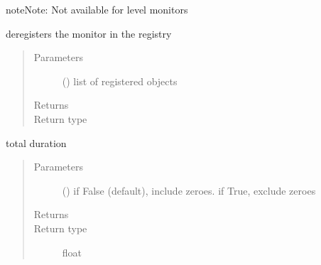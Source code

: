 \documentclass[letterpaper,10pt,english]{sphinxmanual}
\begin{document}
\begin{fulllineitems}
\begin{fulllineitems}
\begin{sphinxadmonition}{note}{Note:}
Not available for level monitors
\end{sphinxadmonition}

\end{fulllineitems}


\begin{fulllineitems}
\label{\detokenize{Reference:salabim.Monitor.deregister}}
deregisters the monitor in the registry
\begin{quote}\begin{description}
\item[{Parameters}] \leavevmode
{} () \textendash{} list of registered objects

\item[{Returns}] \leavevmode
{}

\item[{Return type}] \leavevmode
{\hyperref[\detokenize{Reference:salabim.Monitor}]{}}

\end{description}\end{quote}

\end{fulllineitems}


\begin{fulllineitems}
\label{\detokenize{Reference:salabim.Monitor.duration}}
total duration
\begin{quote}\begin{description}
\item[{Parameters}] \leavevmode
{} () \textendash{} if False (default), include zeroes. if True, exclude zeroes

\item[{Returns}] \leavevmode
{}

\item[{Return type}] \leavevmode
float

\end{description}\end{quote}


\end{fulllineitems}
\end{fulllineitems}
\end{document}
